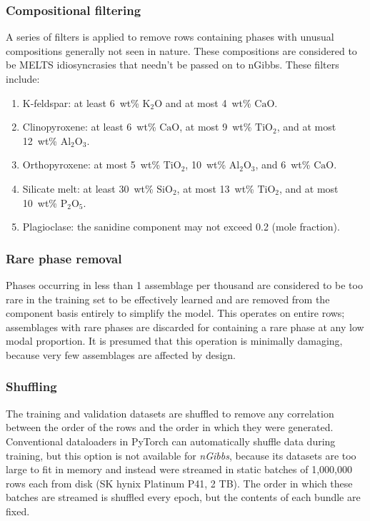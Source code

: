 \subsubsection{Compositional filtering} A series of filters is applied to remove rows containing phases with unusual compositions generally not seen in nature. These
compositions are considered to be MELTS idiosyncrasies that needn't be passed on to nGibbs. 
These filters include:
\begin{enumerate}
  \item K-feldspar: at least 6~wt\% $\mathrm{K_2O}$ and at most 4~wt\% $\mathrm{CaO}$.
  \item Clinopyroxene: at least 6~wt\% $\mathrm{CaO}$, at most 9~wt\% $\mathrm{TiO_2}$,
    and at most 12~wt\% $\mathrm{Al_2O_3}$.
  \item Orthopyroxene: at most 5~wt\% $\mathrm{TiO_2}$, 10~wt\% $\mathrm{Al_2O_3}$,
    and 6~wt\% $\mathrm{CaO}$.
  \item Silicate melt: at least 30~wt\% $\mathrm{SiO_2}$, at most 13~wt\% $\mathrm{TiO_2}$,
    and at most 10~wt\% $\mathrm{P_2O_5}$.
  \item Plagioclase: the sanidine component may not exceed 0.2 (mole fraction).
\end{enumerate}

\subsubsection{Rare phase removal} Phases occurring in less than 1 assemblage per thousand are considered to be too rare in the training set
to be effectively learned and are removed from the component basis entirely to simplify the model.
This operates on entire rows; assemblages with rare phases are discarded
for containing a rare phase at any low modal proportion. It is presumed that this operation is minimally damaging, because very few assemblages are affected by design. 

\subsubsection{Shuffling} The training and validation datasets are shuffled to remove any correlation between the order of the rows and the order in which they were generated.
Conventional dataloaders in PyTorch can automatically shuffle data during training, but this option is not available for \emph{nGibbs}, because
its datasets are too large to fit in memory and instead were streamed in static batches of 1,000,000 rows each from disk (SK hynix Platinum P41, 2 TB). 
The order in which these batches are streamed is shuffled every epoch, but the contents of each bundle are fixed. 

